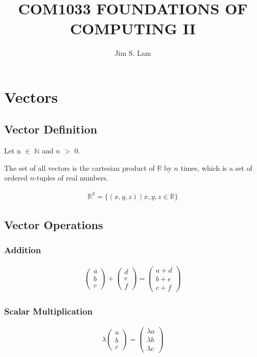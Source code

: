 \documentclass{article}
\author{Jim S. Lam}
\begin{document}
\title{COM1033 FOUNDATIONS OF COMPUTING II}
\maketitle
\tableofcontents
\pagebreak
\section{Vectors}
\subsection{Vector Definition}

Let n $\in$ $\mathbb{N}$ and $n$ $>$ 0.

The set of all vectors is the cartesian product of $\mathbb{R}$ by $n$ times, which is a set of ordered $n$-tuples of real numbers.

\begin{align*}
    \mathbb{R}^3 = \{ (x, y, z) \mid x, y, z \in \mathbb{R} \}
\end{align*}

\subsection{Vector Operations}
\subsubsection{Addition}
\begin{align*}
    \begin{pmatrix} a \\ b \\ c \end{pmatrix} + \begin{pmatrix} d \\ e \\ f \end{pmatrix} = \begin{pmatrix} a + d \\ b + e \\ c + f \end{pmatrix}
\end{align*}
\subsubsection{Scalar Multiplication}
\begin{align*}
    \lambda
    \begin{pmatrix}
        a \\ b \\ c
    \end{pmatrix}
    =
    \begin{pmatrix}
        \lambda a \\ \lambda b \\ \lambda c
    \end{pmatrix}
\end{align*}
\end{document}
